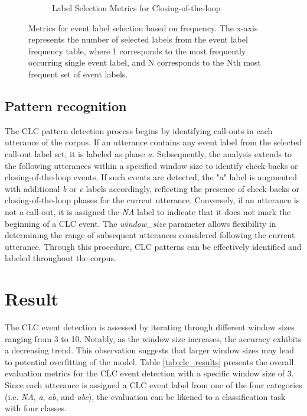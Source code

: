 \documentclass[11pt]{article}
\begin{document}
\begin{figure}
\begin{subfigure}{0.32\textwidth}
    \caption{Label Selection Metrics for Closing-of-the-loop}
    \label{fig:plot3}
  \end{subfigure}

  \caption{Metrics for event label selection based on frequency. The x-axis represents the number of selected labels from the event label frequency table, where 1 corresponds to the most frequently occurring single event label, and N corresponds to the Nth most frequent set of event labels.}
  \label{fig:label_selection}
\end{figure}

\subsection{Pattern recognition}
The CLC pattern detection process begins by identifying call-outs in each utterance of the corpus. If an utterance contains any event label from the selected call-out label set, it is labeled as phase \textit{a}. Subsequently, the analysis extends to the following utterances within a specified window size to identify check-backs or closing-of-the-loop events. If such events are detected, the "a" label is augmented with additional \textit{b} or \textit{c} labels accordingly, reflecting the presence of check-backs or closing-of-the-loop phases for the current utterance. Conversely, if an utterance is not a call-out, it is assigned the \textit{NA} label to indicate that it does not mark the beginning of a CLC event. The \textit{window\_size} parameter allows flexibility in determining the range of subsequent utterances considered following the current utterance. Through this procedure, CLC patterns can be effectively identified and labeled throughout the corpus.

\section{Result}
The CLC event detection is assessed by iterating through different window sizes ranging from 3 to 10. Notably, as the window size increases, the accuracy exhibits a decreasing trend. This observation suggests that larger window sizes may lead to potential overfitting of the model. Table \ref{tab:clc_results} presents the overall evaluation metrics for the CLC event detection with a specific window size of 3. Since each utterance is assigned a CLC event label from one of the four categories (i.e. \textit{NA}, \textit{a}, \textit{ab}, and \textit{abc}), the evaluation can be likened to a classification task with four classes.
\end{document}
